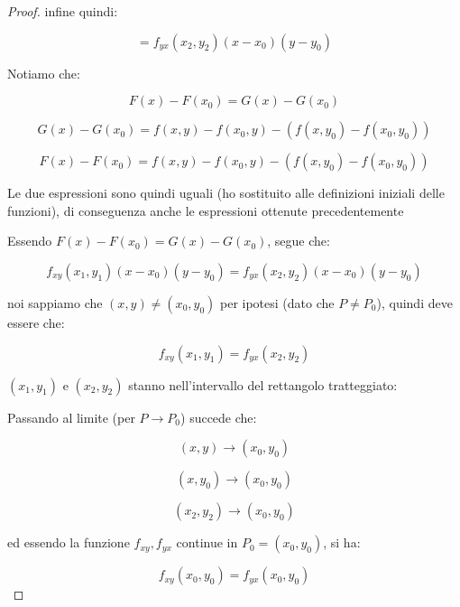 \documentclass[../appunti-analisi.tex]{subfiles}
\begin{document}
\begin{proof}
       infine quindi:

       \[
           = f_{yx}(x_2,y_2)(x-x_0)(y-y_0)
       \]


       Notiamo che:

       \[
           F(x) - F(x_0) = G(x) -G(x_0)
       \]

       \[
           G(x) - G(x_0) = f(x,y) - f(x_0,y) - (f(x,y_0) -f(x_0,y_0))
       \] 

       \[
           F(x) - F(x_0) = f(x,y) - f(x_0,y) - (f(x,y_0) -f(x_0,y_0))
       \] 

       Le due espressioni sono quindi uguali (ho sostituito alle definizioni iniziali delle funzioni), di conseguenza anche le espressioni ottenute precedentemente

       Essendo $F(x) - F(x_0) = G(x) - G(x_0)$, segue che:

       \[
           f_{xy}(x_1,y_1)(x-x_0)(y-y_0) = f_{yx}(x_2,y_2)(x-x_0)(y-y_0)
       \]

       noi sappiamo che $(x,y) \neq (x_0,y_0)$ per ipotesi (dato che $P \neq P_0$), quindi deve essere che:

       \[
           f_{xy}(x_1,y_1) = f_{yx}(x_2,y_2)
       \]

       $(x_1,y_1)$ e $(x_2,y_2)$ stanno nell'intervallo del rettangolo tratteggiato:


       \begin{center}
       \end{center}

       Passando al limite (per $P \rightarrow P_0$) succede che:

       \[
           (x,y) \rightarrow (x_0,y_0)
       \]

       \[
           (x,y_0) \rightarrow (x_0,y_0)
       \]

       \[
           (x_2,y_2) \rightarrow (x_0,y_0)
       \]

       ed essendo la funzione $f_{xy},f_{yx}$ continue in $P_0=(x_0,y_0)$, si ha:

       \[
           f_{xy}(x_0,y_0) = f_{yx}(x_0,y_0)
       \]


\end{proof}
\end{document}
